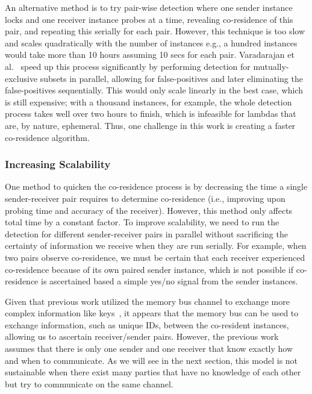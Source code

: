 An alternative method is to try pair-wise detection where one sender instance
locks and one receiver instance probes at a time, revealing co-residence of this
pair, and repeating this serially for each pair. However, this technique is too
slow and scales quadratically with the number of instances e.g., a hundred
instances would take more than 10 hours assuming 10 secs for each pair.
Varadarajan et al.~\cite{varad191016} speed up this process significantly by
performing detection for mutually-exclusive subsets in parallel, allowing for
false-positives and later eliminating the false-positives sequentially. This
would only scale linearly in the best case, which is still expensive; with a
thousand instances, for example, the whole detection process takes well over two
hours to finish, which is infeasible for lambdas that are, by nature, ephemeral.
Thus, one challenge in this work is creating a faster co-residence
algorithm.

\subsubsection{Increasing Scalability}

One method to quicken the co-residence process is by decreasing the time a single
sender-receiver pair requires to determine co-residence (i.e., improving upon
probing time and accuracy of the receiver). However, this method only affects
total time by a constant factor. To improve scalability, we need to
run the detection for different sender-receiver pairs in parallel without
sacrificing the certainty of information we receive when they are run serially.  For
example, when two pairs observe co-residence, we must be certain that each
receiver experienced co-residence because of its own paired sender instance, which
is not possible if co-residence is ascertained based a simple yes/no signal from
the sender instances. 

Given that previous work utilized the memory bus channel to exchange more
complex information like keys~\cite{wuusenix2012}, it appears that the memory
bus can be used to exchange information, such as unique IDs, between the
co-resident instances, allowing us to ascertain receiver/sender pairs.  However,
the previous work assumes that there is only one sender and one receiver that
know exactly how and when to communicate. As we will see in the next section,
this model is not sustainable when there exist many parties that have no
knowledge of each other but try to communicate on the same channel.

